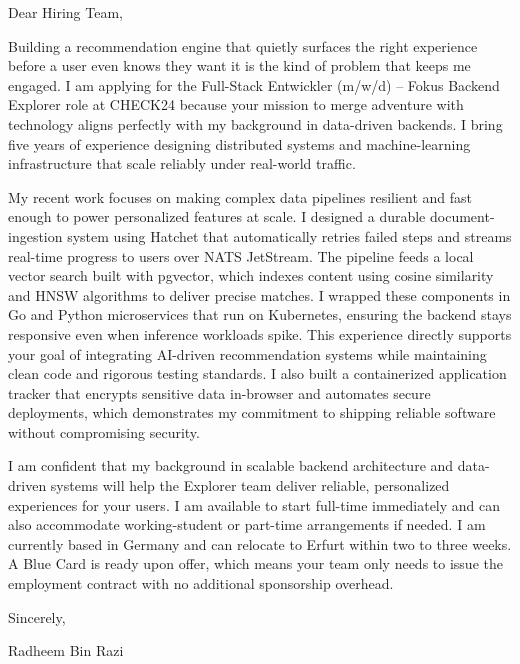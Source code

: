 \documentclass[11pt,a4paper]{coverletter}
\begin{document}

\opening{Dear Hiring Team,}

Building a recommendation engine that quietly surfaces the right experience before a user even knows they want it is the kind of problem that keeps me engaged. I am applying for the Full-Stack Entwickler (m/w/d) – Fokus Backend Explorer role at CHECK24 because your mission to merge adventure with technology aligns perfectly with my background in data-driven backends. I bring five years of experience designing distributed systems and machine-learning infrastructure that scale reliably under real-world traffic.

My recent work focuses on making complex data pipelines resilient and fast enough to power personalized features at scale. I designed a durable document-ingestion system using Hatchet that automatically retries failed steps and streams real-time progress to users over NATS JetStream. The pipeline feeds a local vector search built with pgvector, which indexes content using cosine similarity and HNSW algorithms to deliver precise matches. I wrapped these components in Go and Python microservices that run on Kubernetes, ensuring the backend stays responsive even when inference workloads spike. This experience directly supports your goal of integrating AI-driven recommendation systems while maintaining clean code and rigorous testing standards. I also built a containerized application tracker that encrypts sensitive data in-browser and automates secure deployments, which demonstrates my commitment to shipping reliable software without compromising security.

I am confident that my background in scalable backend architecture and data-driven systems will help the Explorer team deliver reliable, personalized experiences for your users. I am available to start full-time immediately and can also accommodate working-student or part-time arrangements if needed. I am currently based in Germany and can relocate to Erfurt within two to three weeks. A Blue Card is ready upon offer, which means your team only needs to issue the employment contract with no additional sponsorship overhead.

\closing{Sincerely,}{Radheem Bin Razi}

\clearpage
{}

\end{document}
